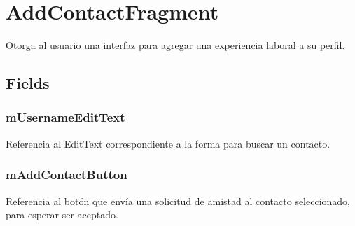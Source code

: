\documentclass[letterpaper,10pt,english]{sphinxmanual}
\begin{document}
\section{AddContactFragment}
\label{Fragments/AddContactFragment::doc}\label{Fragments/AddContactFragment:addcontactfragment}

\begin{fulllineitems}
\label{Fragments/AddContactFragment:com.fiuba.tallerii.jobify.AddContactFragment}
Otorga al usuario una interfaz para agregar una experiencia laboral a su perfil.

\end{fulllineitems}



\subsection{Fields}
\label{Fragments/AddContactFragment:fields}

\subsubsection{mUsernameEditText}
\label{Fragments/AddContactFragment:musernameedittext}

\begin{fulllineitems}
\label{Fragments/AddContactFragment:com.fiuba.tallerii.jobify.AddContactFragment.mUsernameEditText}
Referencia al EditText correspondiente a la forma para buscar un contacto.

\end{fulllineitems}



\subsubsection{mAddContactButton}
\label{Fragments/AddContactFragment:maddcontactbutton}

\begin{fulllineitems}
\label{Fragments/AddContactFragment:com.fiuba.tallerii.jobify.AddContactFragment.mAddContactButton}
Referencia al botón que envía una solicitud de amistad al contacto seleccionado, para esperar ser aceptado.

\end{fulllineitems}
\end{document}
